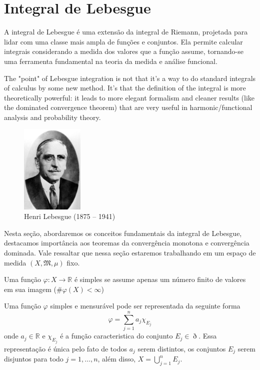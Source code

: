 \documentclass[a4paper, 11pt]{book}
\theoremstyle{definition}
\newcommand{\bR}{\mathbb{R}}
\begin{document}
\section{Integral de Lebesgue}

A integral de Lebesgue é uma extensão da integral de Riemann, projetada para lidar com uma classe mais ampla de funções e conjuntos. Ela permite calcular integrais considerando a medida dos valores que a função assume, tornando-se uma ferramenta fundamental na teoria da medida e análise funcional.

The "point" of Lebesgue integration is not that it's a way to do standard integrals of calculus by some new method. It's that the definition of the integral is more theoretically powerful: it leads to more elegant formalism and cleaner results (like the dominated convergence theorem) that are very useful in harmonic/functional analysis and probability theory. 

\begin{figure}
    \centering
    \includegraphics[width=3cm]{lebesgue.jpeg}
    \caption{Henri Lebesgue (1875 -- 1941)}
\end{figure}

Nesta seção, abordaremos os conceitos fundamentais da integral de Lebesgue, destacamos importância aos teoremas da convergência monotona e convergência dominada.
Vale ressaltar que nessa seção estaremos trabalhando em um espaço de medida $(X, \mathfrak{M}, \mu)$ fixo.

\begin{dbox}
    Uma função $\varphi : X \to \bR$ é simples se assume apenas um número finito de valores em sua imagem ($\# \varphi(X) < \infty$)
\end{dbox}

Uma função $\varphi$ simples e mensurável pode ser representada da seguinte forma
\begin{equation} \label{eq:representacaopadrao}
    \varphi = \sum_{j = 1}^n a_j \chi_{E_j}
\end{equation}
onde $a_j \in \bR$ e $\chi_{E_j}$ é a função caracteristica do conjunto $E_j \in \eth$. Essa representação é única pelo fato de todos $a_j$ serem distintos, os conjuntos $E_j$ serem disjuntos para todo $j = 1,\dots,n$, além disso, $X = \bigcup_{j=1}^n E_j$.    
\end{document}
